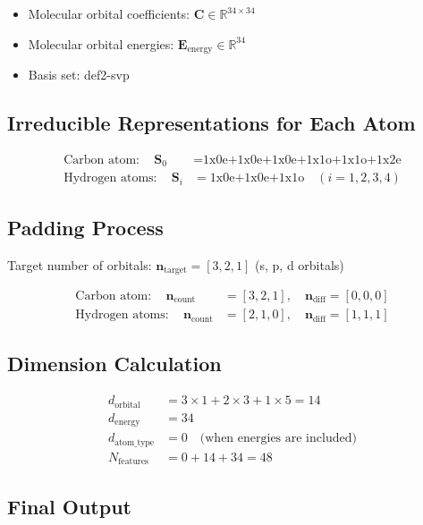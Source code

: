 \documentclass[12pt]{article}
\begin{document}
\begin{itemize}
\item Molecular orbital coefficients: $\mathbf{C} \in \mathbb{R}^{34 \times 34}$
\item Molecular orbital energies: $\mathbf{E}_{\text{energy}} \in \mathbb{R}^{34}$
\item Basis set: def2-svp
\end{itemize}

\subsection{Irreducible Representations for Each Atom}

\begin{align}
\text{Carbon atom}: \quad \mathbf{S}_0 &= \text{1x0e+1x0e+1x0e+1x1o+1x1o+1x2e} \\
\text{Hydrogen atoms}: \quad \mathbf{S}_i &= \text{1x0e+1x0e+1x1o} \quad (i = 1,2,3,4)
\end{align}

\subsection{Padding Process}

Target number of orbitals: $\mathbf{n}_{\text{target}} = [3, 2, 1]$ (s, p, d orbitals)

\begin{align}
\text{Carbon atom}: \quad \mathbf{n}_{\text{count}} &= [3, 2, 1], \quad \mathbf{n}_{\text{diff}} = [0, 0, 0] \\
\text{Hydrogen atoms}: \quad \mathbf{n}_{\text{count}} &= [2, 1, 0], \quad \mathbf{n}_{\text{diff}} = [1, 1, 1]
\end{align}

\subsection{Dimension Calculation}

\begin{align}
d_{\text{orbital}} &= 3 \times 1 + 2 \times 3 + 1 \times 5 = 14 \\
d_{\text{energy}} &= 34 \\
d_{\text{atom\_type}} &= 0 \quad \text{(when energies are included)} \\
N_{\text{features}} &= 0 + 14 + 34 = 48
\end{align}

\subsection{Final Output}
\end{document}
